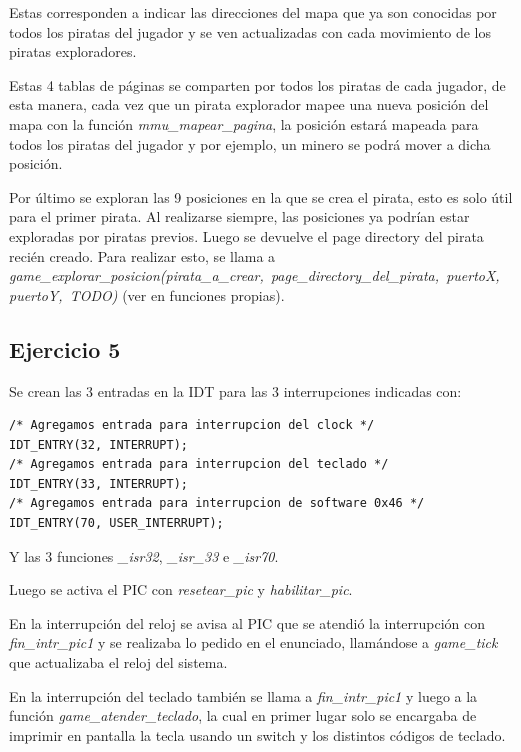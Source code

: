 \begin{itemize}
Estas corresponden a indicar las direcciones del mapa que ya son conocidas por
todos los piratas del jugador y se ven actualizadas con cada movimiento de los
piratas exploradores.

Estas 4 tablas de páginas se comparten por todos los piratas de cada jugador, de
esta manera, cada vez que un pirata explorador mapee una nueva posición del mapa
con la función {\it mmu_mapear_pagina\/}, la posición estará mapeada para todos
los piratas del jugador y por ejemplo, un minero se podrá mover a dicha posición.

Por último se exploran las 9 posiciones en la que se crea el pirata, esto es
solo útil para el primer pirata. Al realizarse siempre, las posiciones ya
podrían estar exploradas por piratas previos. Luego se devuelve el page
directory del pirata recién creado. Para realizar esto, se llama a
\hbox{\it game_explorar_posicion(pirata_a_crear, page_directory_del_pirata, puertoX, puertoY, TODO)}
(ver en funciones propias).
\end{itemize}

\subsection{Ejercicio 5}

Se crean las 3 entradas en la IDT para las 3 interrupciones indicadas con:
\begin{lstlisting}
/* Agregamos entrada para interrupcion del clock */
IDT_ENTRY(32, INTERRUPT);
/* Agregamos entrada para interrupcion del teclado */
IDT_ENTRY(33, INTERRUPT);
/* Agregamos entrada para interrupcion de software 0x46 */
IDT_ENTRY(70, USER_INTERRUPT);
\end{lstlisting}

Y las 3 funciones {\it _isr32\/}, {\it _isr_33\/} e {\it _isr70\/}.

Luego se activa el PIC con {\it resetear_pic\/} y {\it habilitar_pic\/}.

En la interrupción del reloj se avisa al PIC que se atendió la interrupción con
{\it fin_intr_pic1} y se realizaba lo pedido en el enunciado, llamándose a
{\it game_tick\/} que actualizaba el reloj del sistema.


En la interrupción del teclado también se llama a {\it fin_intr_pic1\/} y luego
a la función \hbox{\it game_atender_teclado\/}, la cual en primer lugar solo se
encargaba de imprimir en pantalla la tecla usando un switch y los distintos
códigos de teclado.

